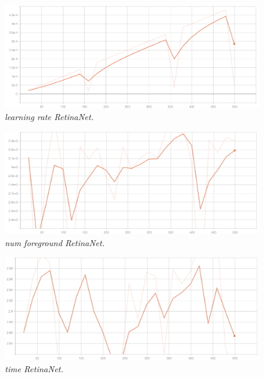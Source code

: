 \begin{figure}[h!]
\begin{center} 
\includegraphics[scale=0.35]{figures/lr_retinanet_5}
\caption{\small \sl learning rate RetinaNet. \label{fig:lr_retinanet}}
\end{center}
\end{figure}

\begin{figure}[h!]
\begin{center} 
\includegraphics[scale=0.35]{figures/num_foreground_6}
\caption{\small \sl num foreground RetinaNet. \label{fig:num_foreground}}
\end{center}
\end{figure}

\begin{figure}[h!]
\begin{center} 
\includegraphics[scale=0.35]{figures/time_retinanet_7}
\caption{\small \sl time RetinaNet. \label{fig:time_retinanet}}
\end{center}
\end{figure}

